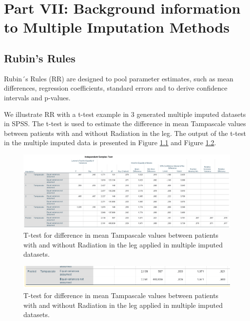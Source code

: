 \documentclass[]{book}
\begin{document}
\part{Part VII: Background information to Multiple Imputation
Methods}\label{part-part-vii-background-information-to-multiple-imputation-methods}

\chapter{Rubin's Rules}\label{rubins-rules}

Rubin´s Rules (RR) are designed to pool parameter estimates, such as
mean differences, regression coefficients, standard errors and to derive
confidence intervals and p-values.

We illustrate RR with a t-test example in 3 generated multiple imputed
datasets in SPSS. The t-test is used to estimate the difference in mean
Tampascale values between patients with and without Radiation in the
leg. The output of the t-test in the multiple imputed data is presented
in Figure \ref{fig:tab9-1} and Figure \ref{fig:tab9-2}.

\begin{figure}

{\centering \includegraphics[width=0.9\linewidth]{images/table5.1} 

}

\caption{T-test for difference in mean Tampascale values between patients with and without Radiation in the leg applied in multiple imputed datasets.}\label{fig:tab9-1}
\end{figure}

\begin{figure}

{\centering \includegraphics[width=0.9\linewidth]{images/table5.1b} 

}

\caption{T-test for difference in mean Tampascale values between patients with and without Radiation in the leg applied in multiple imputed datasets.}\label{fig:tab9-2}
\end{figure}
\end{document}
